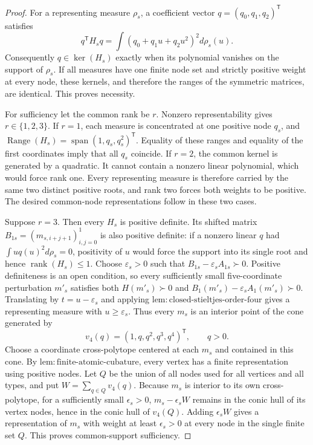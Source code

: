 \documentclass{article}
\begin{document}
\begin{proof}
For a representing measure \(\rho_s\), a coefficient vector
\(q=(q_0,q_1,q_2)^{\mathsf T}\) satisfies
\[
 q^{\mathsf T}H_sq=\int(q_0+q_1u+q_2u^2)^2d\rho_s(u).
\]
Consequently \(q\in\ker(H_s)\) exactly when its polynomial vanishes on the
support of \(\rho_s\).  If all measures have one finite node set and strictly
positive weight at every node, these kernels, and therefore the ranges of the
symmetric matrices, are identical.  This proves necessity.

For sufficiency let the common rank be \(r\).  Nonzero representability gives
\(r\in\{1,2,3\}\).  If \(r=1\), each measure is concentrated at one positive
node \(q_s\), and
\(\operatorname{Range}(H_s)=\operatorname{span}(1,q_s,q_s^2)^{\mathsf T}\).
Equality of these ranges and equality of the first coordinates imply that all
\(q_s\) coincide.  If \(r=2\), the common kernel is generated by a quadratic.
It cannot contain a nonzero linear polynomial, which would force rank one.
Every representing measure is therefore carried by the same two distinct
positive roots, and rank two forces both weights to be positive.  The desired
common-node representations follow in these two cases.

Suppose \(r=3\).  Then every \(H_s\) is positive definite.  Its shifted matrix
\(B_{1s}=(m_{s,i+j+1})_{i,j=0}^1\) is also positive definite: if a nonzero
linear \(q\) had \(\int u q(u)^2d\rho_s=0\), positivity of \(u\) would force
the support into its single root and hence \(\operatorname{rank}(H_s)\le1\).
Choose \(\varepsilon_s>0\) such that
\(B_{1s}-\varepsilon_sA_{1s}\succ0\).  Positive definiteness is an open
condition, so every sufficiently small five-coordinate perturbation
\(m'_s\) satisfies both \(H(m'_s)\succ0\) and
\(B_1(m'_s)-\varepsilon_sA_1(m'_s)\succ0\).  Translating by
\(t=u-\varepsilon_s\) and applying
\(\mathrm{lem{:}closed\text{-}stieltjes\text{-}order\text{-}four}\) gives a
representing measure with \(u\ge\varepsilon_s\).  Thus every \(m_s\) is an
interior point of the cone generated by
\[
 v_4(q)=(1,q,q^2,q^3,q^4)^{\mathsf T},\qquad q>0. \tag{2}
\]
Choose a coordinate cross-polytope centered at each \(m_s\) and contained in
this cone.  By \(\mathrm{lem{:}finite\text{-}atomic\text{-}cubature}\), every
vertex has a finite representation using positive nodes.  Let \(Q\) be the
union of all nodes used for all vertices and all types, and put
\(W=\sum_{q\in Q}v_4(q)\).  Because \(m_s\) is interior to its own
cross-polytope, for a sufficiently small \(\epsilon_s>0\),
\(m_s-\epsilon_sW\) remains in the conic hull of its vertex nodes, hence in
the conic hull of \(v_4(Q)\).  Adding \(\epsilon_sW\) gives a representation
of \(m_s\) with weight at least \(\epsilon_s>0\) at every node in the single
finite set \(Q\).  This proves common-support sufficiency.


\end{proof}
\end{document}
